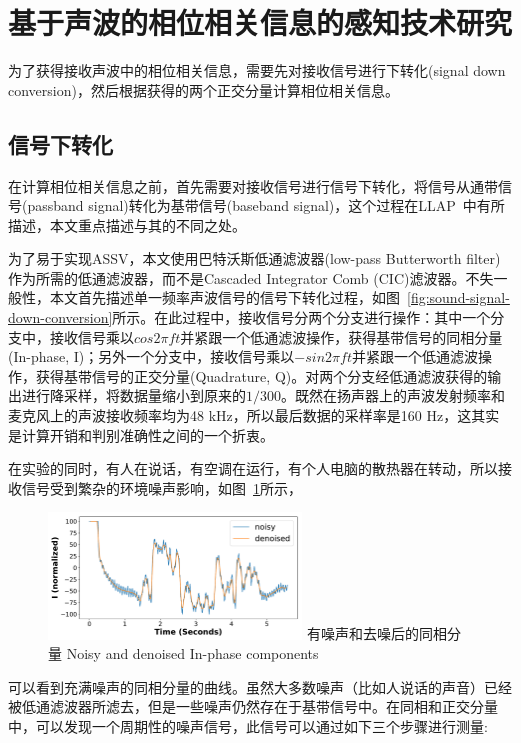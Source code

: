 \section{基于声波的相位相关信息的感知技术研究}\label{sec:sensing-research}
为了获得接收声波中的相位相关信息，需要先对接收信号进行下转化(signal down conversion)，然后根据获得的两个正交分量计算相位相关信息。

\subsection{信号下转化}
在计算相位相关信息之前，首先需要对接收信号进行信号下转化，将信号从通带信号(passband signal)转化为基带信号(baseband signal)，这个过程在LLAP~\cite{wang2016device}中有所描述，本文重点描述与其的不同之处。

为了易于实现ASSV，本文使用巴特沃斯低通滤波器(low-pass Butterworth filter)作为所需的低通滤波器，而不是Cascaded Integrator Comb (CIC)滤波器。不失一般性，本文首先描述单一频率声波信号的信号下转化过程，如图~\ref{fig:sound-signal-down-conversion}所示。在此过程中，接收信号分两个分支进行操作：其中一个分支中，接收信号乘以$cos2\pi ft$并紧跟一个低通滤波操作，获得基带信号的同相分量(In-phase, I)；另外一个分支中，接收信号乘以$-sin2\pi ft$并紧跟一个低通滤波操作，获得基带信号的正交分量(Quadrature, Q)。对两个分支经低通滤波获得的输出进行降采样，将数据量缩小到原来的$1/300$。既然在扬声器上的声波发射频率和麦克风上的声波接收频率均为48 kHz，所以最后数据的采样率是160 Hz，这其实是计算开销和判别准确性之间的一个折衷。


在实验的同时，有人在说话，有空调在运行，有个人电脑的散热器在转动，所以接收信号受到繁杂的环境噪声影响，如图~\ref{fig:noisy-denoised-component}所示，
\begin{figure}[!htp]
  \centering
  \includegraphics[width=0.6\textwidth]{figure/noisy-I.pdf}
  \bicaption
    {有噪声和去噪后的同相分量}
    {Noisy and denoised In-phase components}
  \label{fig:noisy-denoised-component}
\end{figure}
可以看到充满噪声的同相分量的曲线。虽然大多数噪声（比如人说话的声音）已经被低通滤波器所滤去，但是一些噪声仍然存在于基带信号中。在同相和正交分量中，可以发现一个周期性的噪声信号，此信号可以通过如下三个步骤进行测量:


